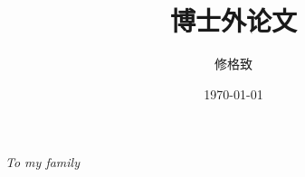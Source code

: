 \documentclass[b5paper]{ctexbook}
\title{博士外论文}
\author{修格致}
\date{\today}
\begin{document}
\maketitle

\begin{center}
    {\emph{To my family}}
\end{center}



\tableofcontents










\end{document}
